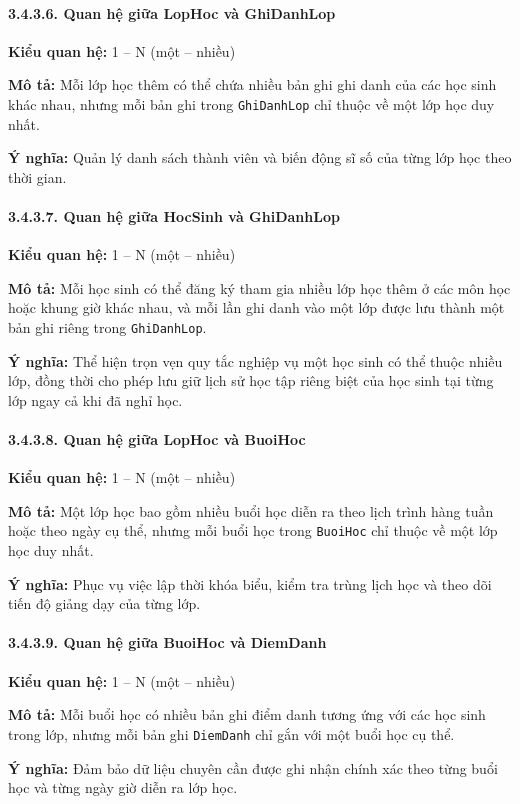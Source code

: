 \paragraph{3.4.3.6. Quan hệ giữa LopHoc và GhiDanhLop}\mbox{}\par
\textbf{Kiểu quan hệ:} 1 -- N (một -- nhiều)\par
\textbf{Mô tả:} Mỗi lớp học thêm có thể chứa nhiều bản ghi ghi danh của các học sinh khác nhau, nhưng mỗi bản ghi trong \texttt{GhiDanhLop} chỉ thuộc về một lớp học duy nhất.\par
\textbf{Ý nghĩa:} Quản lý danh sách thành viên và biến động sĩ số của từng lớp học theo thời gian.

\paragraph{3.4.3.7. Quan hệ giữa HocSinh và GhiDanhLop}\mbox{}\par
\textbf{Kiểu quan hệ:} 1 -- N (một -- nhiều)\par
\textbf{Mô tả:} Mỗi học sinh có thể đăng ký tham gia nhiều lớp học thêm ở các môn học hoặc khung giờ khác nhau, và mỗi lần ghi danh vào một lớp được lưu thành một bản ghi riêng trong \texttt{GhiDanhLop}.\par
\textbf{Ý nghĩa:} Thể hiện trọn vẹn quy tắc nghiệp vụ một học sinh có thể thuộc nhiều lớp, đồng thời cho phép lưu giữ lịch sử học tập riêng biệt của học sinh tại từng lớp ngay cả khi đã nghỉ học.

\paragraph{3.4.3.8. Quan hệ giữa LopHoc và BuoiHoc}\mbox{}\par
\textbf{Kiểu quan hệ:} 1 -- N (một -- nhiều)\par
\textbf{Mô tả:} Một lớp học bao gồm nhiều buổi học diễn ra theo lịch trình hàng tuần hoặc theo ngày cụ thể, nhưng mỗi buổi học trong \texttt{BuoiHoc} chỉ thuộc về một lớp học duy nhất.\par
\textbf{Ý nghĩa:} Phục vụ việc lập thời khóa biểu, kiểm tra trùng lịch học và theo dõi tiến độ giảng dạy của từng lớp.

\paragraph{3.4.3.9. Quan hệ giữa BuoiHoc và DiemDanh}\mbox{}\par
\textbf{Kiểu quan hệ:} 1 -- N (một -- nhiều)\par
\textbf{Mô tả:} Mỗi buổi học có nhiều bản ghi điểm danh tương ứng với các học sinh trong lớp, nhưng mỗi bản ghi \texttt{DiemDanh} chỉ gắn với một buổi học cụ thể.\par
\textbf{Ý nghĩa:} Đảm bảo dữ liệu chuyên cần được ghi nhận chính xác theo từng buổi học và từng ngày giờ diễn ra lớp học.

